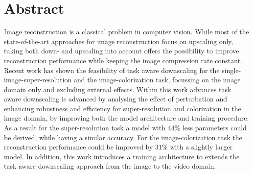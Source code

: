 \newpage
\vspace{3cm}
\chapter*{Abstract}
\noindent Image reconstruction is a classical problem in computer vision.
While most of the state-of-the-art approaches for image reconstruction
focus on upscaling only, taking both down- and upscaling into account offers the possibility to improve reconstruction performance while keeping the image compression rate constant. Recent work has shown the feasibility of task aware downscaling for the single-image-super-resolution and the image-colorization task, focussing on the image domain only and excluding external effects.
\newline
Within this work advances task aware downscaling is advanced by analysing the effect of perturbation and enhancing robustness and efficiency for super-resolution and colorization in the image domain, by improving both the model architecture and training procedure. As a result for the super-resolution task a model with $44 \%$ less parameters could be derived, while having a similar accuracy. For the image-colorization task the reconstruction performance could be improved by $31 \%$ with a slightly larger model. In addition, this work introduces a training architecture to extends the task aware downscaling approach from the image to the video domain.



